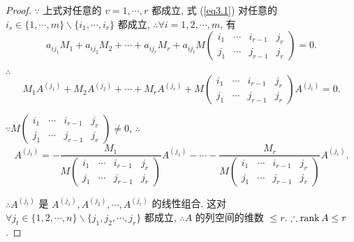 \documentclass[color=black,device=normal,lang=cn,mode=geye]{elegantnote}
\begin{document}
\begin{proof}
    $\because$ 上式对任意的 $v=1,\cdots,r$ 都成立, 式 (\ref{eq3.1}) 对任意的 $i_s\in\{1,\cdots,m\}\backslash\{i_1,\cdots,i_r\}$ 都成立, $\therefore\forall i=1,2,\cdots,m$, 有
    \[a_{ij_1}M_1+a_{ij_2}M_2+\cdots+a_{ij_r}M_r+a_{ij_t}M\begin{pmatrix}
        i_1 & \cdots & i_{r-1} & j_r \\
        j_1 & \cdots & j_{r-1} & j_r
    \end{pmatrix}=0.\]

    $\therefore$
    \[M_1A^{(j_1)}+M_2A^{(j_2)}+\cdots+M_rA^{(j_r)}+M\begin{pmatrix}
        i_1 & \cdots & i_{r-1} & j_r \\
        j_1 & \cdots & j_{r-1} & j_r
    \end{pmatrix}A^{(j_t)}=0.\]

    $\because M\begin{pmatrix} i_1 & \cdots & i_{r-1} & j_r \\ j_1 & \cdots & j_{r-1} & j_r \end{pmatrix}\neq0$, $\therefore$
    \[A^{(j_t)}=-\dfrac{M_1}{M\begin{pmatrix}
        i_1 & \cdots & i_{r-1} & j_r \\
        j_1 & \cdots & j_{r-1} & j_r
    \end{pmatrix}}A^{(j_1)}-\cdots-\dfrac{M_r}{M\begin{pmatrix}
        i_1 & \cdots & i_{r-1} & j_r \\
        j_1 & \cdots & j_{r-1} & j_r
    \end{pmatrix}}A^{(j_r)}.\]

    $\therefore A^{(j_t)}$ 是 $A^{(j_1)},A^{(j_2)},\cdots,A^{(j_r)}$ 的线性组合. 这对 $\forall j_t\in\{1,2,\cdots,n\}\backslash\{j_1,j_2,\cdots,j_r\}$ 都成立, $\therefore A$ 的列空间的维数 $\leq r$. $\therefore\operatorname{rank} A\leq r$.
\end{proof}
\end{document}
